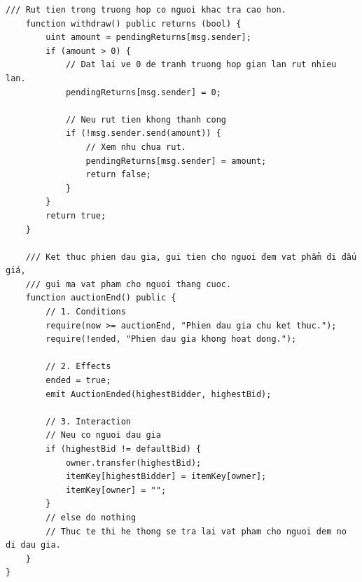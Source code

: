\documentclass[a4paper]{article}
\begin{document}
\begin{frame}
\begin{lstlisting}[basicstyle=\small]
    /// Rut tien trong truong hop co nguoi khac tra cao hon.
    function withdraw() public returns (bool) {
        uint amount = pendingReturns[msg.sender];
        if (amount > 0) {
            // Dat lai ve 0 de tranh truong hop gian lan rut nhieu lan.
            pendingReturns[msg.sender] = 0;
            
            // Neu rut tien khong thanh cong
            if (!msg.sender.send(amount)) {
                // Xem nhu chua rut.
                pendingReturns[msg.sender] = amount;
                return false;
            }
        }
        return true;
    }

    /// Ket thuc phien dau gia, gui tien cho nguoi đem vat phẩm đi đấu giá,
    /// gui ma vat pham cho nguoi thang cuoc.
    function auctionEnd() public {
        // 1. Conditions
        require(now >= auctionEnd, "Phien dau gia chu ket thuc.");
        require(!ended, "Phien dau gia khong hoat dong.");

        // 2. Effects
        ended = true;
        emit AuctionEnded(highestBidder, highestBid);

        // 3. Interaction
        // Neu co nguoi dau gia
		if (highestBid != defaultBid) {
    		owner.transfer(highestBid);
    		itemKey[highestBidder] = itemKey[owner];
    		itemKey[owner] = "";
		}
		// else do nothing
		// Thuc te thi he thong se tra lai vat pham cho nguoi dem no di dau gia.
    }
}
\end{lstlisting}
\end{frame}
\end{document}
